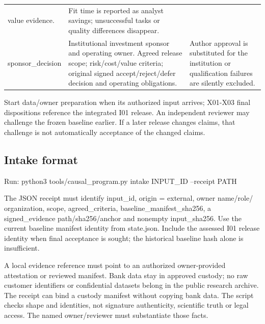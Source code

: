 \documentclass[
  11pt,
  a4paper,
]{article}
\begin{document}
\begin{longtable}[]{@{}lll@{}}
\begin{minipage}[t]{0.30\columnwidth}
value evidence.\strut
\end{minipage} & \begin{minipage}[t]{0.30\columnwidth}\raggedright
Fit time is reported as analyst savings; unsuccessful tasks or quality
differences disappear.\strut
\end{minipage}\tabularnewline
\begin{minipage}[t]{0.30\columnwidth}\raggedright
sponsor\_decision\strut
\end{minipage} & \begin{minipage}[t]{0.30\columnwidth}\raggedright
Institutional investment sponsor and operating owner. Agreed release
scope; risk/cost/value criteria; original signed accept/reject/defer
decision and operating obligations.\strut
\end{minipage} & \begin{minipage}[t]{0.30\columnwidth}\raggedright
Author approval is substituted for the institution or qualification
failures are silently excluded.\strut
\end{minipage}\tabularnewline
\bottomrule
\end{longtable}

Start data/owner preparation when its authorized input arrives; X01-X03
final dispositions reference the integrated I01 release. An independent
reviewer may challenge the frozen baseline earlier. If a later release
changes claims, that challenge is not automatically acceptance of the
changed claims.

\hypertarget{intake-format}{%
\subsection{Intake format}\label{intake-format}}

Run: python3 tools/causal\_program.py intake INPUT\_ID --receipt PATH

The JSON receipt must identify input\_id, origin = external, owner
name/role/ organization, scope, agreed\_criteria,
baseline\_manifest\_sha256, a signed\_evidence path/sha256/anchor and
nonempty input\_sha256. Use the current baseline manifest identity from
state.json. Include the assessed I01 release identity when final
acceptance is sought; the historical baseline hash alone is
insufficient.

A local evidence reference must point to an authorized owner-provided
attestation or reviewed manifest. Bank data stay in approved custody; no
raw customer identifiers or confidential datasets belong in the public
research archive. The receipt can bind a custody manifest without
copying bank data. The script checks shape and identities, not signature
authenticity, scientific truth or legal access. The named owner/reviewer
must substantiate those facts.
\end{document}
